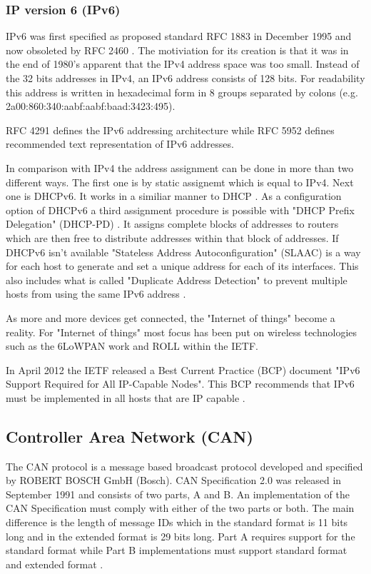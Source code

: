 \subsubsection{IP version 6 (IPv6)}
IPv6 was first specified as proposed standard RFC 1883 \cite{web:rfc1883} in
December 1995 and now obsoleted by RFC 2460 \cite{web:rfc2460}. The motiviation for
its creation is that it was in the end of 1980's apparent that the
IPv4 address space was too small. Instead of the 32 bits addresses in IPv4, an
IPv6 address consists of 128 bits. For readability this address is
written in hexadecimal form in 8 groups separated by colons
(e.g. 2a00:860:340:aabf:aabf:baad:3423:495).

RFC 4291 defines the IPv6
addressing architecture \cite{web:rfc4291} while RFC 5952 \cite{web:rfc5952}
defines recommended text representation of IPv6 addresses.

In comparison with IPv4 the address assignment can be done in more than two different
ways. The first one is by static assignemt which is equal to IPv4.
Next one is DHCPv6. It works in a similiar manner
to DHCP \cite{web:rfc3315}. As a configuration option of DHCPv6 a third
assignment procedure is possible with "DHCP
Prefix Delegation" (DHCP-PD) \cite{web:rfc3633}. It assigns complete blocks of
addresses to routers which are then free to distribute addresses within that
block of addresses. If DHCPv6 isn't available "Stateless Address
Autoconfiguration" (SLAAC) is a way for each host to generate and set a unique
address for each of its interfaces.
This also includes what is called "Duplicate Address Detection" to prevent
multiple hosts from using the same IPv6 address \cite{web:rfc4862, web:rfc4941}.

As more and more devices get connected, the "Internet of things" become a
reality. For "Internet of things" most focus has been put on wireless
technologies such as the 6LoWPAN \cite{web:ietf_charter_6lowpan} work and
ROLL \cite{web:ietf_charter_roll} within the IETF.

In April 2012 the IETF released a Best Current Practice (BCP) document
"IPv6 Support Required for All IP-Capable Nodes". This BCP recommends that
IPv6 must be implemented in all hosts that are IP capable \cite{web:rfc6540}.

\subsection{Controller Area Network (CAN)}
The CAN protocol is a message based broadcast protocol developed and specified
by ROBERT BOSCH GmbH (Bosch). CAN Specification 2.0 was released in September
1991 and consists of two parts, A and B. An implementation of the CAN
Specification must comply with either of the two parts or both. The main
difference is the length of message IDs which in the standard format is 11 bits
long and in the extended format is 29 bits long. Part A requires support for
the standard format while Part B implementations must support
standard format and extended format \cite{standard:can_bus}.


